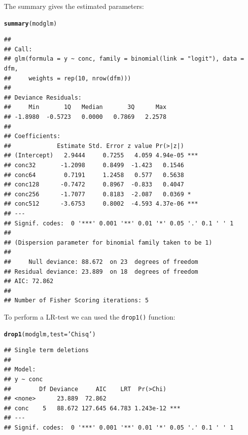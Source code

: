 \documentclass{scrartcl}\usepackage[]{graphicx}\usepackage[]{color}
\makeatletter
\newcommand{\hlstr}[1]{\textcolor[rgb]{0.192,0.494,0.8}{#1}}%
\newcommand{\hlstd}[1]{\textcolor[rgb]{0.345,0.345,0.345}{#1}}%
\newcommand{\hlkwc}[1]{\textcolor[rgb]{0.333,0.667,0.333}{#1}}%
\newcommand{\hlkwd}[1]{\textcolor[rgb]{0.737,0.353,0.396}{\textbf{#1}}}%
\newenvironment{kframe}{%
 \def\at@end@of@kframe{}%
 \ifinner\ifhmode%
  \def\at@end@of@kframe{\end{minipage}}%
  \begin{minipage}{\columnwidth}%
 \fi\fi%
 \def\FrameCommand##1{\hskip\@totalleftmargin \hskip-\fboxsep
 \colorbox{shadecolor}{##1}\hskip-\fboxsep
     \hskip-\linewidth \hskip-\@totalleftmargin \hskip\columnwidth}%
 \MakeFramed {\advance\hsize-\width
   \@totalleftmargin\z@ \linewidth\hsize
   \@setminipage}}%
 {\par\unskip\endMakeFramed%
 \at@end@of@kframe}
\newenvironment{knitrout}{}{} %
\makeatother
\begin{document}
The summary gives the estimated parameters:
\begin{knitrout}
\color{fgcolor}\begin{kframe}
\begin{alltt}
\hlkwd{summary}\hlstd{(modglm)}
\end{alltt}
\begin{verbatim}
## 
## Call:
## glm(formula = y ~ conc, family = binomial(link = "logit"), data = dfm, 
##     weights = rep(10, nrow(dfm)))
## 
## Deviance Residuals: 
##     Min       1Q   Median       3Q      Max  
## -1.8980  -0.5723   0.0000   0.7869   2.2578  
## 
## Coefficients:
##             Estimate Std. Error z value Pr(>|z|)    
## (Intercept)   2.9444     0.7255   4.059 4.94e-05 ***
## conc32       -1.2098     0.8499  -1.423   0.1546    
## conc64        0.7191     1.2458   0.577   0.5638    
## conc128      -0.7472     0.8967  -0.833   0.4047    
## conc256      -1.7077     0.8183  -2.087   0.0369 *  
## conc512      -3.6753     0.8002  -4.593 4.37e-06 ***
## ---
## Signif. codes:  0 '***' 0.001 '**' 0.01 '*' 0.05 '.' 0.1 ' ' 1
## 
## (Dispersion parameter for binomial family taken to be 1)
## 
##     Null deviance: 88.672  on 23  degrees of freedom
## Residual deviance: 23.889  on 18  degrees of freedom
## AIC: 72.862
## 
## Number of Fisher Scoring iterations: 5
\end{verbatim}
\end{kframe}
\end{knitrout}

To perform a LR-test we can used the \texttt{drop1()} function:
\begin{knitrout}
\color{fgcolor}\begin{kframe}
\begin{alltt}
\hlkwd{drop1}\hlstd{(modglm,} \hlkwc{test} \hlstd{=} \hlstr{'Chisq'}\hlstd{)}
\end{alltt}
\begin{verbatim}
## Single term deletions
## 
## Model:
## y ~ conc
##        Df Deviance     AIC    LRT  Pr(>Chi)    
## <none>      23.889  72.862                     
## conc    5   88.672 127.645 64.783 1.243e-12 ***
## ---
## Signif. codes:  0 '***' 0.001 '**' 0.01 '*' 0.05 '.' 0.1 ' ' 1
\end{verbatim}
\end{kframe}
\end{knitrout}
\end{document}

